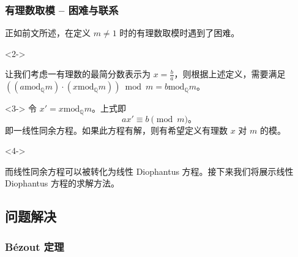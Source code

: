 \documentclass{../pkslide}
\begin{document}
\begin{frame}
  \frametitle{有理数取模 -- 困难与联系}
  正如前文所述，在定义 $m \ne 1$ 时的有理数取模时遇到了困难。
  
  \begin{uncoverenv}<2->
    \emptyline
    
    让我们考虑一有理数的最简分数表示为 $x = \frac{b}{a}$，则根据上述定义，需要满足 $((a \mathbin{\mathrm{mod}_{\mathbb Q}} m) \cdot (x \mathbin{\mathrm{mod}_{\mathbb Q}} m)) \bmod m = b \mathbin{\mathrm{mod}_{\mathbb Q}} m$。
  \end{uncoverenv}
  
  \begin{uncoverenv}<3->
    令 $x' = x \mathbin{\mathrm{mod}_{\mathbb Q}} m$。上式即%
    \[ a x' \equiv b \pmod{m} \text{。} \]
    即一线性同余方程。如果此方程有解，则有希望定义有理数 $x$ 对 $m$ 的模。
  \end{uncoverenv}
  
  \begin{uncoverenv}<4->
    \emptyline
    
    而线性同余方程可以被转化为线性 Diophantus 方程。接下来我们将展示线性 Diophantus 方程的求解方法。
  \end{uncoverenv}
\end{frame}


\subsection{问题解决}
\subsubsection{Bézout 定理}

\end{document}
